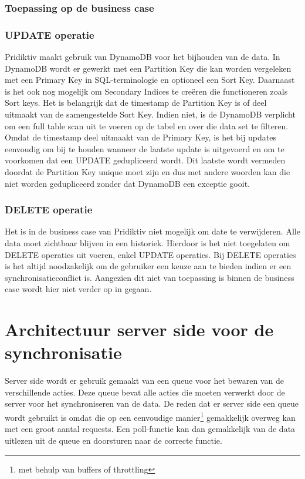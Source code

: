 \subsubsection{Toepassing op de business case}
\subsubsection{UPDATE operatie}
Pridiktiv maakt gebruik van DynamoDB voor het bijhouden van de data. In DynamoDB wordt er gewerkt met een Partition Key die kan worden vergeleken met een Primary Key in SQL-terminologie en optioneel een Sort Key. Daarnaast is het ook nog mogelijk om Secondary Indices te cre\"eren die functioneren zoals Sort keys.  Het is belangrijk dat de timestamp de Partition Key is of deel uitmaakt van de samengestelde Sort Key. Indien niet, is de DynamoDB verplicht om een full table scan uit te voeren op de tabel en over die data set te filteren. Omdat de timestamp deel uitmaakt van de Primary Key, is het bij updates eenvoudig om bij te houden wanneer de laatste update is uitgevoerd en om te voorkomen dat een UPDATE gedupliceerd wordt. Dit laatste wordt vermeden doordat de Partition Key unique moet zijn en dus met andere woorden kan die niet worden gedupliceerd zonder dat DynamoDB een exceptie gooit.
\subsubsection{DELETE operatie}
Het is in de business case van Pridiktiv niet mogelijk om date te verwijderen. Alle data moet zichtbaar blijven in een historiek. Hierdoor is het niet toegelaten om DELETE operaties uit voeren, enkel UPDATE operaties. Bij DELETE operaties is het altijd noodzakelijk om de gebruiker een keuze aan te bieden indien er een synchronisatieconflict is. Aangezien dit niet van toepassing is binnen de business case wordt hier niet verder op in gegaan.

\section{Architectuur server side voor de synchronisatie}
Server side wordt er gebruik gemaakt van een queue voor het bewaren van de verschillende acties. Deze queue bevat alle acties die moeten verwerkt door de server voor het synchroniseren van de data. De reden dat er server side een queue wordt gebruikt is omdat die op een eenvoudige manier\footnote{met behulp van buffers of throttling} gemakkelijk overweg kan met een groot aantal requests. Een poll-functie kan dan gemakkelijk van de data uitlezen uit de queue en doorsturen naar de correcte functie.
